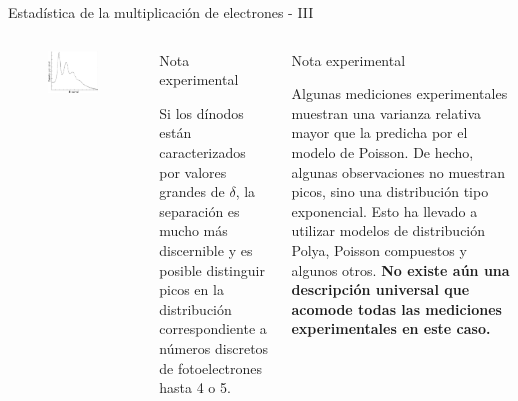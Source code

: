 \documentclass[a4paper,10pt]{beamer}
\begin{document}
\begin{frame}{Estadística de la multiplicación de electrones - III}

 \begin{columns}[c]
 
\column{2in}

\begin{figure}
 \includegraphics[scale=0.215]{fig13a}
\end{figure}

\begin{exampleblock}{Nota experimental}
\begin{justify}
\begin{footnotesize}
Si los dínodos están caracterizados por valores grandes de $\delta$, la separación 
es mucho más discernible y es posible distinguir picos en la distribución correspondiente 
a números discretos de fotoelectrones hasta 4 o 5.
\end{footnotesize}
\end{justify}
\end{exampleblock}

\column{2in}

\begin{exampleblock}{Nota experimental}
\begin{justify}
\begin{footnotesize}
Algunas mediciones experimentales muestran una varianza relativa mayor que la predicha 
por el modelo de Poisson. De hecho, algunas observaciones no muestran picos, sino 
una distribución tipo exponencial. Esto ha llevado a utilizar modelos de distribución
Polya, Poisson compuestos y algunos otros. \textbf{No existe aún una descripción universal
que acomode todas las mediciones experimentales en este caso.}
\end{footnotesize}
\end{justify}
\end{exampleblock}

\end{columns}

\end{frame}
\end{document}
